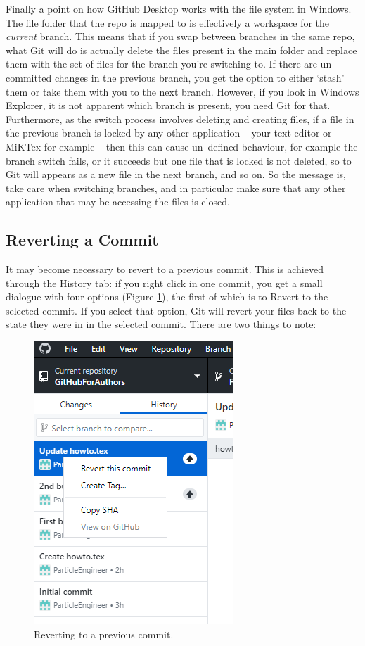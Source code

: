 \documentclass[a4paper, 12pt]{article}
\begin{document}
Finally a point on how GitHub Desktop works with the file system in Windows. The file folder that the repo is mapped to is effectively a workspace for the \textit{current} branch. This means that if you swap between branches in the same repo, what Git will do is actually delete the files present in the main folder and replace them with the set of files for the branch you're switching to. If there are un--committed changes in the previous branch, you get the option to either `stash' them or take them with you to the next branch. However, if you look in Windows Explorer, it is not apparent which branch is present, you need Git for that. Furthermore, as the switch process involves deleting and creating files, if a file in the previous branch is locked by any other application -- your text editor or MiKTex for example -- then this can cause un--defined behaviour, for example the branch switch fails, or it succeeds but one file that is locked is not deleted, so to Git will appears as a new file in the next branch, and so on. So the message is, take care when switching branches, and in particular make sure that any other application that may be accessing the files is closed.

\subsection{Reverting a Commit}
It may become necessary to revert to a previous commit. This is achieved through the History tab: if you right click in one commit, you get a small dialogue with four options (Figure \ref{revert}), the first of which is to Revert to the selected commit. If you select that option, Git will revert your files back to the state they were in in the selected commit. There are two things to note:

\begin{figure}
\centering
\includegraphics{Revert}
\caption{Reverting to a previous commit.}
\label{revert}
\end{figure}
\end{document}
